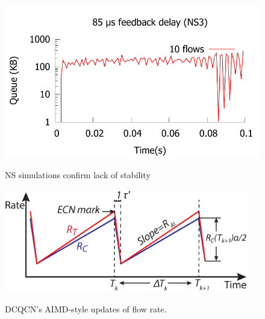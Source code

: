 \begin{figure}[t]
{\begin{minipage}{0.31\textwidth}
\includegraphics[width=0.99\columnwidth]{figures/stable_queue_85_ns.pdf}
\vspace{-2em}
\caption{NS simulations confirm lack of stability}
\label{fig:dcqcn_unstable_ns}

\includegraphics[width=0.95\textwidth]{figures/dcqcn_convergence_brief.eps}
\vspace{-1em}
\caption{DCQCN's AIMD-style updates of flow rate.}
\vspace{-1.5em}
\label{fig:dcqcn_convergence}

\end{minipage}
}
\end{figure}


